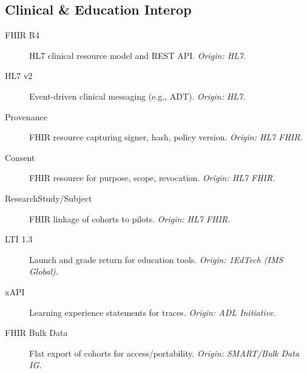 \documentclass[11pt]{article}
\theoremstyle{plain}
\begin{document}
\subsection*{Clinical \& Education Interop}
\begin{description}
  \item[FHIR R4] HL7 clinical resource model and REST API. \emph{Origin: HL7.}
  \item[HL7 v2] Event-driven clinical messaging (e.g., ADT). \emph{Origin: HL7.}
  \item[Provenance] FHIR resource capturing signer, hash, policy version. \emph{Origin: HL7 FHIR.}
  \item[Consent] FHIR resource for purpose, scope, revocation. \emph{Origin: HL7 FHIR.}
  \item[ResearchStudy/Subject] FHIR linkage of cohorts to pilots. \emph{Origin: HL7 FHIR.}
  \item[LTI 1.3] Launch and grade return for education tools. \emph{Origin: 1EdTech (IMS Global).}
  \item[xAPI] Learning experience statements for traces. \emph{Origin: ADL Initiative.}
  \item[FHIR Bulk Data] Flat export of cohorts for access/portability. \emph{Origin: SMART/Bulk Data IG.}
\end{description}
\end{document}
